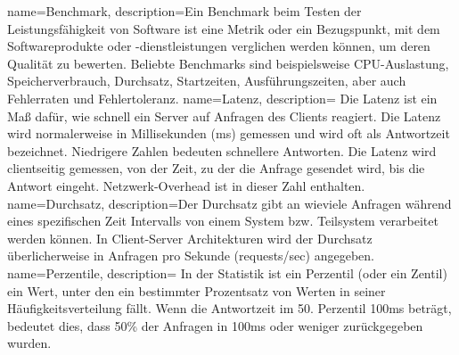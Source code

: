 {
  name=Benchmark,
  description={Ein Benchmark beim Testen der Leistungsfähigkeit von Software ist
      eine Metrik oder ein Bezugspunkt, mit dem Softwareprodukte oder -dienstleistungen verglichen werden können, um deren Qualität zu bewerten.
      Beliebte Benchmarks sind beispielsweise CPU-Auslastung, Speicherverbrauch, Durchsatz, Startzeiten, Ausführungszeiten,
      aber auch Fehlerraten und Fehlertoleranz.
    }
}
{
  name=Latenz,
  description={
      Die Latenz ist ein Maß dafür, wie schnell ein Server auf Anfragen des Clients reagiert.
      Die Latenz wird normalerweise in Millisekunden (ms) gemessen und wird oft als Antwortzeit bezeichnet.
      Niedrigere Zahlen bedeuten schnellere Antworten. Die Latenz wird clientseitig gemessen, von der
      Zeit, zu der die Anfrage gesendet wird, bis die Antwort eingeht. Netzwerk-Overhead ist in dieser Zahl enthalten.}
}
{
  name=Durchsatz,
  description={Der Durchsatz gibt an wieviele Anfragen während eines spezifischen Zeit Intervalls von einem System bzw. Teilsystem
      verarbeitet werden können. In Client-Server Architekturen wird der Durchsatz überlicherweise
      in Anfragen pro Sekunde (requests/sec) angegeben.}
}
{
  name=Perzentile,
  description=
    {In der Statistik ist ein Perzentil (oder ein Zentil) ein Wert, unter den ein bestimmter Prozentsatz von Werten in seiner Häufigkeitsverteilung fällt.
      Wenn die Antwortzeit im 50. Perzentil 100ms beträgt, bedeutet dies, dass 50\% der Anfragen in 100ms oder weniger zurückgegeben wurden.
    }
}
